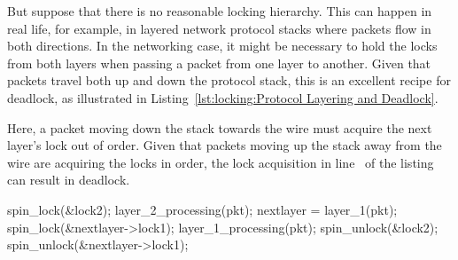 But suppose that there is no reasonable locking hierarchy.
This can happen in real life, for example, in layered network protocol stacks
where packets flow in both directions.
In the networking case, it might be necessary to hold the locks from
both layers when passing a packet from one layer to another.
Given that packets travel both up and down the protocol stack, this
is an excellent recipe for deadlock, as illustrated in
Listing~\ref{lst:locking:Protocol Layering and Deadlock}.
\begin{fcvref}
Here, a packet moving down the stack towards the wire must acquire
the next layer's lock out of order.
Given that packets moving up the stack away from the wire are acquiring
the locks in order, the lock acquisition in line~ of the listing
can result in deadlock.
\end{fcvref}

\begin{listing}[tbp]
\begin{fcvlabel}
\begin{VerbatimL}[commandchars=\\\{\}]
spin_lock(&lock2);
layer_2_processing(pkt);
nextlayer = layer_1(pkt);
spin_lock(&nextlayer->lock1);	
layer_1_processing(pkt);
spin_unlock(&lock2);
spin_unlock(&nextlayer->lock1);
\end{VerbatimL}
\end{fcvlabel}
\caption{Protocol Layering and Deadlock}
\label{lst:locking:Protocol Layering and Deadlock}
\end{listing}

